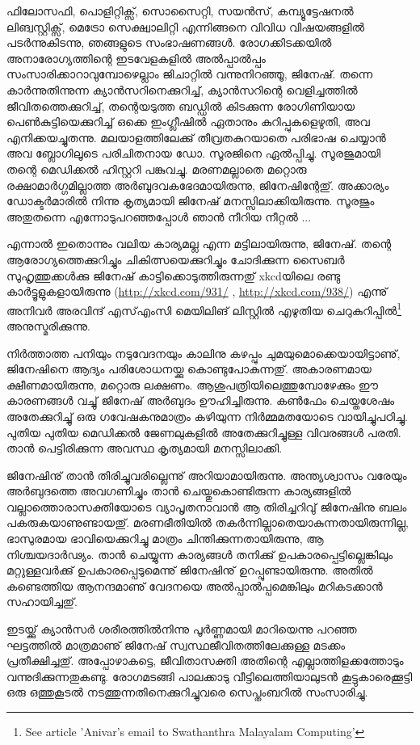 ഫിലോസഫി, പൊളിറ്റിക്സ്, സൊസൈറ്റി, സയന്‍സ്, കമ്പ്യൂട്ടേഷനല്‍ ലിങ്വസ്റ്റിക്സ്, മെട്രോ സെക്ഷ്വാലിറ്റി എന്നിങ്ങനെ വിവിധ 
വിഷയങ്ങളില്‍ പടര്‍ന്നുകിടന്നു, ഞങ്ങളുടെ സംഭാഷണങ്ങള്‍. രോഗക്കിടക്കയില്‍ അനാരോഗ്യത്തിന്റെ ഇടവേളകളില്‍ 
അല്‍പ്പാല്‍പ്പം സംസാരിക്കാറാവുമ്പോഴെല്ലാം ജിചാറ്റില്‍ വന്നുനിറഞ്ഞൂ, ജിനേഷ്. തന്നെ കാര്‍ന്നുതിന്നുന്ന ക്യാന്‍സറിനെക്കുറിച്ച്, 
ക്യാന്‍സറിന്റെ വെളിച്ചത്തില്‍ ജീവിതത്തെക്കുറിച്ച്, തന്റെയടുത്ത ബഡ്ഡില്‍ കിടക്കുന്ന രോഗിണിയായ പെണ്‍കുട്ടിയെക്കുറിച്ച് 
ഒക്കെ ഇംഗ്ലീഷില്‍ ഏതാനും കുറിപ്പുകളെഴുതി, അവ എനിക്കയച്ചുതന്നു. മലയാളത്തിലേക്കു് തീവ്രതകുറയാതെ പരിഭാഷ ചെയ്യാന്‍ 
അവ ബ്ലോഗിലൂടെ പരിചിതനായ ഡോ. സൂരജിനെ ഏല്‍പ്പിച്ചു. സൂരജുമായി തന്റെ മെഡിക്കല്‍ ഹിസ്റ്ററി പങ്കുവച്ചു. മരണമല്ലാതെ 
മറ്റൊരു രക്ഷാമാര്‍ഗ്ഗമില്ലാത്ത അര്‍ബുദവകഭേദമായിരുന്നു, ജിനേഷിന്റേതു്. അക്കാര്യം ഡോക്ടര്‍മാരില്‍ നിന്നു കൃത്യമായി 
ജിനേഷ് മനസ്സിലാക്കിയിരുന്നു. സൂരജും അതുതന്നെ എന്നോടുപറഞ്ഞപ്പോള്‍ ഞാന്‍ നീറിയ നീറ്റല്‍ ...

എന്നാല്‍ ഇതൊന്നും വലിയ കാര്യമല്ല എന്ന മട്ടിലായിരുന്നു, ജിനേഷ്. തന്റെ ആരോഗ്യത്തെക്കുറിച്ചും ചികിത്സയെക്കുറിച്ചും 
ചോദിക്കുന്ന സൈബര്‍ സുഹൃത്തുക്കള്‍ക്കു ജിനേഷ് കാട്ടിക്കൊടുത്തിരുന്നതു് xkcdയിലെ രണ്ടു കാര്‍ട്ടൂളുകളായിരുന്നു 
(\url{http://xkcd.com/931/}  , \url{http://xkcd.com/938/}) എന്നു് അനിവര്‍ അരവിന്ദ് എസ്എംസി മെയിലിങ് ലിസ്റ്റില്‍ എഴുതിയ 
ചെറുകുറിപ്പില്‍\footnote{See article 'Anivar's email to Swathanthra Malayalam Computing'} അനുസ്മരിക്കുന്നു. 

നിര്‍ത്താത്ത പനിയും നടുവേദനയും കാലിനു കഴപ്പും ചുമയുമൊക്കെയായിട്ടാണു്, ജിനേഷിനെ ആദ്യം പരിശോധനയ്ക്കു 
കൊണ്ടുപോകുന്നതു്. അകാരണമായ ക്ഷീണമായിരുന്നു, മറ്റൊരു ലക്ഷണം. ആശുപത്രിയിലെത്തുമ്പോഴേക്കും ഈ 
കാരണങ്ങള്‍ വച്ചു് ജിനേഷ് അര്‍ബുദം ഊഹിച്ചിരുന്നു. കണ്‍ഫേം ചെയ്തശേഷം അതേക്കുറിച്ചു് ഒരു ഗവേഷകനുമാത്രം 
കഴിയുന്ന നിര്‍മ്മമതയോടെ വായിച്ചുപഠിച്ചു. പുതിയ പുതിയ മെഡിക്കല്‍ ജേണലുകളില്‍ അതേക്കുറിച്ചുള്ള വിവരങ്ങള്‍ പരതി. 
താന്‍ പെട്ടിരിക്കുന്ന അവസ്ഥ കൃത്യമായി മനസ്സിലാക്കി.

ജിനേഷിനു് താന്‍ തിരിച്ചുവരില്ലെന്നു് അറിയാമായിരുന്നു. അന്ത്യശ്വാസം വരേയും അര്‍ബുദത്തെ അവഗണിച്ചും താന്‍ 
ചെയ്തുകൊണ്ടിരുന്ന കാര്യങ്ങളില്‍ വല്ലാത്തൊരാസക്തിയോടെ വ്യാപൃതനാവാന്‍ ആ തിരിച്ചറിവു് ജിനേഷിനു ബലം 
പകരുകയാണുണ്ടായതു്. മരണഭീതിയില്‍ തകര്‍ന്നില്ലാതെയാകുന്നതായിരുന്നില്ല, ഭാസുരമായ ഭാവിയെക്കുറിച്ചു മാത്രം 
ചിന്തിക്കുന്നതായിരുന്നു, ആ നിശ്ചയദാര്‍ഢ്യം. താന്‍ ചെയ്യുന്ന കാര്യങ്ങള്‍ തനിക്കു് ഉപകാരപ്പെട്ടില്ലെങ്കിലും മറ്റുള്ളവര്‍ക്കു് 
ഉപകാരപ്പെടുമെന്നു് ജിനേഷിനു് ഉറപ്പുണ്ടായിരുന്നു. അതില്‍ കണ്ടെത്തിയ ആനന്ദമാണു് വേദനയെ അല്‍പ്പാല്‍പ്പമെങ്കിലും 
മറികടക്കാന്‍ സഹായിച്ചതു്.

ഇടയ്ക്കു് ക്യാന്‍സര്‍ ശരീരത്തില്‍നിന്നു പൂര്‍ണ്ണമായി മാറിയെന്നു പറഞ്ഞ ഘട്ടത്തില്‍ മാത്രമാണു് ജിനേഷ് 
സ്വസ്ഥജീവിതത്തിലേക്കുള്ള മടക്കം പ്രതീക്ഷിച്ചതു്. അപ്പോഴാകട്ടെ, ജീവിതാസക്തി അതിന്റെ എല്ലാത്തിളക്കത്തോടും 
വന്നുദിക്കുന്നതുകണ്ടു. രോഗമടങ്ങി പാലക്കാടു വീട്ടിലെത്തിയാലുടന്‍ കൂട്ടുകാരെക്കൂട്ടി ഒരു ഒത്തുകൂടല്‍ നടത്തുന്നതിനെക്കുറിച്ചുവരെ 
സെപ്തംബറില്‍ സംസാരിച്ചു.

